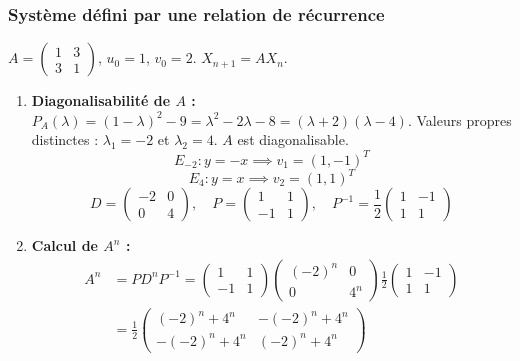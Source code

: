 \documentclass[french]{yLectureNote}
\begin{document}
\subsubsection{Système défini par une relation de récurrence}
$A=\begin{pmatrix}1&3\\ 3&1\end{pmatrix}$, $u_{0}=1$, $v_{0}=2$. $X_{n+1} = A X_n$.

\begin{enumerate}
    \item \textbf{Diagonalisabilité de $A$ :}
    $P_A(\lambda) = (1-\lambda)^2 - 9 = \lambda^2 - 2\lambda - 8 = (\lambda+2)(\lambda-4)$.
    Valeurs propres distinctes : $\lambda_1 = -2$ et $\lambda_2 = 4$. $A$ est diagonalisable.
    $$E_{-2}: y=-x \implies v_1 = (1, -1)^T$$
    $$E_{4}: y=x \implies v_2 = (1, 1)^T$$
    $$D = \begin{pmatrix} -2&0\\ 0&4 \end{pmatrix}, \quad P = \begin{pmatrix} 1&1\\ -1&1 \end{pmatrix}, \quad P^{-1} = \frac{1}{2} \begin{pmatrix} 1&-1\\ 1&1 \end{pmatrix}$$

    \item \textbf{Calcul de $A^{n}$ :}
    \begin{align*}
    A^n &= P D^n P^{-1} = \begin{pmatrix} 1&1\\ -1&1 \end{pmatrix} \begin{pmatrix} (-2)^n&0\\ 0&4^n \end{pmatrix} \frac{1}{2} \begin{pmatrix} 1&-1\\ 1&1 \end{pmatrix} \\
    &= \frac{1}{2} \begin{pmatrix} (-2)^n+4^n & -(-2)^n+4^n \\ -(-2)^n+4^n & (-2)^n+4^n \end{pmatrix}
    \end{align*}


\end{enumerate}
\end{document}
